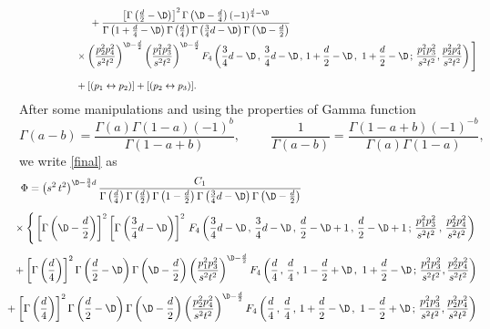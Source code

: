 \documentclass[a4paper,11pt,openright,twoside]{book}
\numberwithin{equation}{section}
\begin{document}
{\begin{equation}
\begin{aligned}
		&\hspace{2.5cm}+\frac{\left[\Gamma\left(\frac{d}{2}-\D\right)\right]^2\Gamma\left(\D-\frac{d}{4}\right)(-1)^{\frac{d}{4}-\D}}{\Gamma\left(1+\frac{d}{4}-\D\right)\Gamma\left(\frac{d}{4}\right)\Gamma\left(\frac{3}{4}d-\D\right)\Gamma\left(\D-\frac{d}{2}\right)} \\
		&\hspace{2cm}\times \left(\frac{p_2^2p_4^2}{s^2t^2}\right)^{\D-\frac{d}{2}}\left(\frac{p_1^2p_3^2}{s^2t^2}\right)^{\D-\frac{d}{2}}F_4\left(\frac{3}{4}d-\D\,,\,\frac{3}{4}d-\D\, ,\,1+\frac{d}{2}-\D\,,\,\,1+\frac{d}{2}-\D\,;\,\frac{p_1^2p_3^2}{s^2t^2},\frac{p_2^2p_4^2}{s^2t^2}\right)\Bigg] \\[1.2ex]
		&\hspace{2cm} +[(p_1\leftrightarrow p_2)]+[(p_2\leftrightarrow p_3)].\label{final}
	\end{aligned}
\end{equation}
After some manipulations and using the properties of Gamma function
\begin{equation}
	\Gamma(a-b)=\frac{\Gamma(a)\Gamma(1-a)(-1)^b}{\Gamma(1-a+b)},\hspace{1cm}\frac{1}{\Gamma(a-b)}=\frac{\Gamma(1-a+b)(-1)^{-b}}{\Gamma(a)\Gamma(1-a)},
\end{equation}
we write \eqref{final} as
\begin{align}
	\Phi&=\left(s^2\,t^2\right)^{\D-\frac{3}{4}d}\frac{C_1}{\Gamma\left(\frac{d}{4}\right)\Gamma\left(\frac{d}{2}\right)\Gamma\left(1-\frac{d}{2}\right)\Gamma\left(\frac{3}{4}d-\D\right)\Gamma\left(\D-\frac{d}{2}\right)}\notag\\[1.2ex]
	&\hspace{-0.5cm}\times\Bigg\{ \left[\Gamma\left(\D-\frac{d}{2}\right)\right]^2\left[\Gamma\left(\frac{3}{4}d-\D\right)\right]^2\,F_4\left(\frac{3}{4}d-\D\,,\,\frac{3}{4}d-\D\, ,\,\frac{d}{2}-\D+1\,,\,\frac{d}{2}-\D+1\,;\,\frac{p_1^2p_3^2}{s^2t^2}\, ,\,\frac{p_2^2p_4^2}{s^2t^2}\right)\notag\\[1.2ex]
	&\hspace{-0.5cm}+\left[\Gamma\left(\frac{d}{4}\right)\right]^2\Gamma\left(\frac{d}{2}-\D\right)\Gamma\left(\D-\frac{d}{2}\right)\left(\frac{p_1^2p_3^2}{s^2t^2}\right)^{\D-\frac{d}{2}}  F_4\left(\frac{d}{4}\,,\,\frac{d}{4}\, ,\,1-\frac{d}{2}+\D\,,\,\,1+\frac{d}{2}-\D\,;\,\frac{p_1^2p_3^2}{s^2t^2},\frac{p_2^2p_4^2}{s^2t^2}\right)\notag
\end{align}
\begin{align}
	&\hspace{-0.5cm}+\left[\Gamma\left(\frac{d}{4}\right)\right]^2\Gamma\left(\frac{d}{2}-\D\right)\Gamma\left(\D-\frac{d}{2}\right)\left(\frac{p_2^2p_4^2}{s^2t^2}\right)^{\D-\frac{d}{2}} F_4\left(\frac{d}{4}\,,\,\frac{d}{4}\, ,\,1+\frac{d}{2}-\D\,,\,\,1-\frac{d}{2}+\D\,;\,\frac{p_1^2p_3^2}{s^2t^2},\frac{p_2^2p_4^2}{s^2t^2}\right)\notag\\[1.2ex]

\end{align}}
\end{document}
